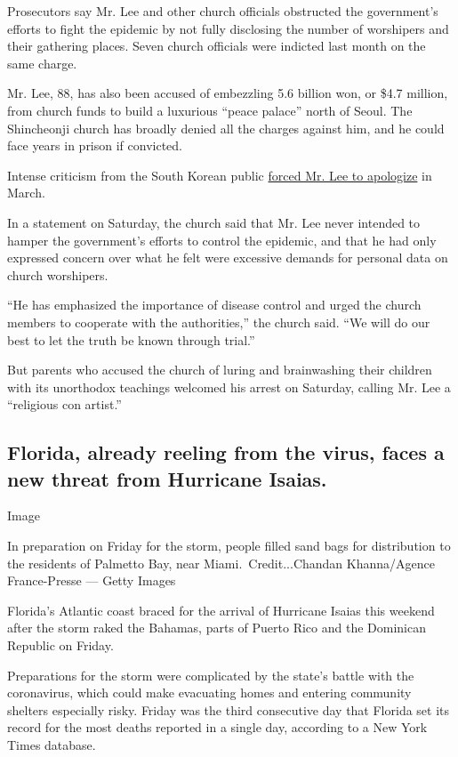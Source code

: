 Prosecutors say Mr. Lee and other church officials obstructed the
government's efforts to fight the epidemic by not fully disclosing the
number of worshipers and their gathering places. Seven church officials
were indicted last month on the same charge.

Mr. Lee, 88, has also been accused of embezzling 5.6 billion won, or
\$4.7 million, from church funds to build a luxurious ``peace palace''
north of Seoul. The Shincheonji church has broadly denied all the
charges against him, and he could face years in prison if convicted.

Intense criticism from the South Korean public
\href{https://www.nytimes3xbfgragh.onion/2020/03/02/world/asia/coronavirus-south-korea-shincheonji.html}{forced
Mr. Lee to apologize} in March.

In a statement on Saturday, the church said that Mr. Lee never intended
to hamper the government's efforts to control the epidemic, and that he
had only expressed concern over what he felt were excessive demands for
personal data on church worshipers.

``He has emphasized the importance of disease control and urged the
church members to cooperate with the authorities,'' the church said.
``We will do our best to let the truth be known through trial.''

But parents who accused the church of luring and brainwashing their
children with its unorthodox teachings welcomed his arrest on Saturday,
calling Mr. Lee a ``religious con artist.''

\hypertarget{florida-already-reeling-from-the-virus-faces-a-new-threat-from-hurricane-isaias}{%
\subsection{Florida, already reeling from the virus, faces a new threat
from Hurricane
Isaias.}\label{florida-already-reeling-from-the-virus-faces-a-new-threat-from-hurricane-isaias}}

Image

In preparation on Friday for the storm, people filled sand bags for
distribution to the residents of Palmetto Bay, near
Miami.~Credit...Chandan Khanna/Agence France-Presse --- Getty Images

Florida's Atlantic coast braced for the arrival of Hurricane Isaias this
weekend after the storm raked the Bahamas, parts of Puerto Rico and the
Dominican Republic on Friday.

Preparations for the storm were complicated by the state's battle with
the coronavirus, which could make evacuating homes and entering
community shelters especially risky. Friday was the third consecutive
day that Florida set its record for the most deaths reported in a single
day, according to a New York Times database.

